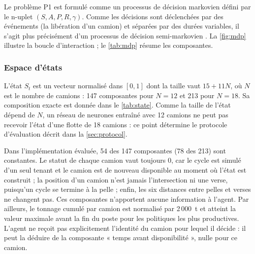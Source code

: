 \documentclass[11pt,a4paper]{article}
\newif\ifrevmarks
\newcommand{\revtag}[1]{\ifrevmarks\textsuperscript{\textcolor{red!70!black}{\scriptsize[#1]}}\fi}
\newenvironment{revbloc}[1]{\par\ifrevmarks\color{revcolor}\noindent\revtag{#1}\ \fi}{\par}
\newcommand{\aexp}[1]{\ifrevmarks\textcolor{orange!85!black}{\textbf{[EXPÉRIENCE À FAIRE : #1]}}\fi}
\begin{document}
\begin{revbloc}{M9, M24, Dir. 30/09}
Le problème P1 est formulé comme un processus de décision markovien \cite{Puterman1994, RichardSutton2018} défini par le n-uplet $(S, A, P, R, \gamma)$. Comme les décisions sont déclenchées par des événements (la libération d'un camion) et séparées par des durées variables, il s'agit plus précisément d'un processus de décision semi-markovien \cite{BradtkeDuff1995, SuttonPrecupSingh1999}. La \cref{fig:mdp} illustre la boucle d'interaction ; le \cref{tab:mdp} résume les composantes.
\end{revbloc}

\subsubsection{Espace d'états}

\begin{revbloc}{M1, N1, N2, N3}
L'état $S_t$ est un vecteur normalisé dans $[0,1]$ dont la taille vaut $15 + 11N$, où $N$ est le nombre de camions : 147 composantes pour $N=12$ et 213 pour $N=18$. Sa composition exacte est donnée dans le \cref{tab:state}. Comme la taille de l'état dépend de $N$, un réseau de neurones entraîné avec 12 camions ne peut pas recevoir l'état d'une flotte de 18 camions : ce point détermine le protocole d'évaluation décrit dans la \cref{sec:protocol}.

Dans l'implémentation évaluée, 54 des 147 composantes (78 des 213) sont constantes. Le statut de chaque camion vaut toujours 0, car le cycle est simulé d'un seul tenant et le camion est de nouveau disponible au moment où l'état est construit ; la position d'un camion n'est jamais l'intersection ni une verse, puisqu'un cycle se termine à la pelle ; enfin, les six distances entre pelles et verses ne changent pas. Ces composantes n'apportent aucune information à l'agent. Par ailleurs, le tonnage cumulé par camion est normalisé par 2\,000~t et atteint la valeur maximale avant la fin du poste pour les politiques les plus productives. L'agent ne reçoit pas explicitement l'identité du camion pour lequel il décide : il peut la déduire de la composante « temps avant disponibilité », nulle pour ce camion.
\end{revbloc}

\aexp{supprimer ou corriger les composantes constantes (statut, positions jamais occupées, distances fixes) et revoir la normalisation du tonnage avant les nouveaux entraînements (rapport d'audit, N1 à N3).}
\end{document}
